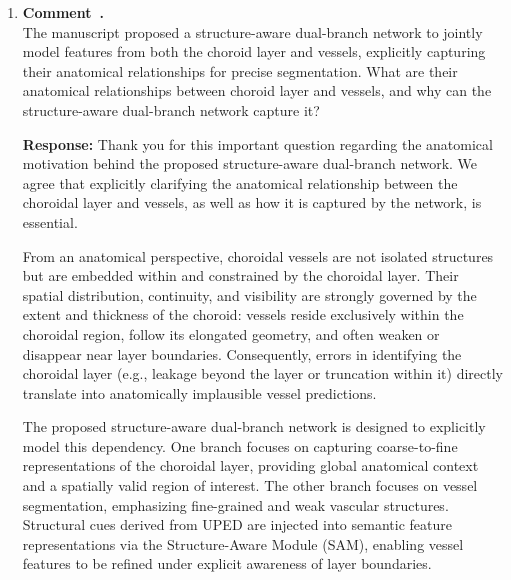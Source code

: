 \documentclass[11pt]{article}
\newcommand{\commentresponse}[2]{{\color{blue}\textbf{Response:} #2}}
\newcommand{\commentitem}{\item \textbf{Comment~\arabic{enumi}.}\\\ignorespaces}
\begin{document}
\begin{enumerate}
{    In contrast, the UPED-derived structural features explicitly encode \emph{where} intensity transitions and topology-consistent boundaries occur, which are particularly important for delineating weak and thin choroidal vessels under severe speckle noise. The role of SAM is therefore to inject these explicit structural cues into the semantic feature space via channel-wise and spatial attention, so that high-level semantic representations become more boundary-aware and anatomically consistent.

    In summary, the ``semantics'' in SAM correspond to learned, high-level OCT feature representations from the encoder, while the structural cues come from UPED. SAM bridges these two types of information to improve vessel boundary localization and robustness.
    }

    \commentitem The manuscript proposed a structure-aware dual-branch network to jointly model features from both the choroid layer and vessels, explicitly capturing their anatomical relationships for precise segmentation. What are their anatomical relationships between choroid layer and vessels, and why can the structure-aware dual-branch network capture it?
    
    \commentresponse{7}{
    Thank you for this important question regarding the anatomical motivation behind the proposed structure-aware dual-branch network. We agree that explicitly clarifying the anatomical relationship between the choroidal layer and vessels, as well as how it is captured by the network, is essential.

    From an anatomical perspective, choroidal vessels are not isolated structures but are embedded within and constrained by the choroidal layer. Their spatial distribution, continuity, and visibility are strongly governed by the extent and thickness of the choroid: vessels reside exclusively within the choroidal region, follow its elongated geometry, and often weaken or disappear near layer boundaries. Consequently, errors in identifying the choroidal layer (e.g., leakage beyond the layer or truncation within it) directly translate into anatomically implausible vessel predictions.

    The proposed structure-aware dual-branch network is designed to explicitly model this dependency. One branch focuses on capturing coarse-to-fine representations of the choroidal layer, providing global anatomical context and a spatially valid region of interest. The other branch focuses on vessel segmentation, emphasizing fine-grained and weak vascular structures. Structural cues derived from UPED are injected into semantic feature representations via the Structure-Aware Module (SAM), enabling vessel features to be refined under explicit awareness of layer boundaries.

}
\end{enumerate}
\end{document}
